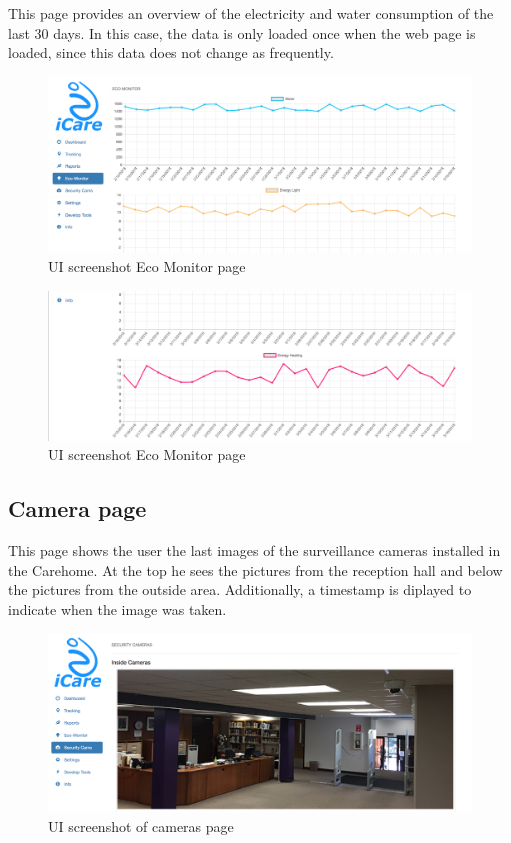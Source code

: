 This page provides an overview of the electricity and water consumption of the last 30 days.
In this case, the data is only loaded once when the web page is loaded, since this data does not change as frequently.

\begin{figure}[H]
	\centering
	\includegraphics[width =1\textwidth]{images/uiEcoMonitor1.png}
	\caption{UI screenshot Eco Monitor  page}
\end{figure}

\begin{figure}[H]
	\centering
	\includegraphics[width =1\textwidth]{images/uiEcoMonitor2.png}
	\caption{UI screenshot Eco Monitor  page}
\end{figure}


\subsection{Camera page}

This page shows the user the last images of the surveillance cameras installed in the Carehome.
At the top he sees the pictures from the reception hall and below the pictures from the outside area. Additionally, a timestamp is diplayed to indicate when the image was taken.
\begin{figure}[H]
	\centering
	\includegraphics[width =1\textwidth]{images/uiCameras1.png}
	\caption{UI screenshot of cameras page}
\end{figure}

